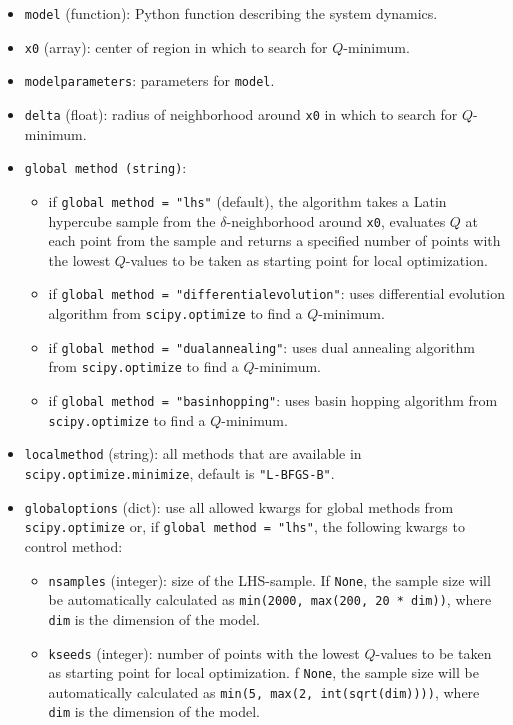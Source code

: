 \documentclass{article}
\theoremstyle{definition}
\begin{document}
\begin{refsection}
\begin{itemize}
    \item {\tt model} (function): Python function describing the system dynamics.
    \item {\tt x0} (array): center of region in which to search for $Q$-minimum.
    \item {\tt model\textunderscore parameters}: parameters for {\tt model}.
    \item {\tt delta} (float): radius of neighborhood around {\tt x0} in which to search for $Q$-minimum.
    \item {\tt global method (string)}: 
    \begin{itemize}
        \item if {\tt global method = "lhs"} (default), the algorithm takes a Latin hypercube sample from the $\delta$-neighborhood around {\tt x0}, evaluates $Q$ at each point from the sample and returns a specified number of points with the lowest $Q$-values to be taken as starting point for local optimization.
        \item if {\tt global method = "differential\textunderscore evolution"}: uses differential evolution algorithm from {\tt scipy.optimize} to find a $Q$-minimum.
        \item if {\tt global method = "dual\textunderscore annealing"}: uses dual annealing algorithm from {\tt scipy.optimize} to find a $Q$-minimum.
         \item if {\tt global method = "basin\textunderscore hopping"}: uses basin hopping algorithm from {\tt scipy.optimize} to find a $Q$-minimum.
    \end{itemize}
    \item {\tt local\textunderscore method} (string): all methods that are available in {\tt scipy.optimize.minimize}, default is {\tt "L-BFGS-B"}.
    \item {\tt global\textunderscore options} (dict): use all allowed kwargs for global methods from {\tt scipy.optimize} or, if {\tt global method = "lhs"}, the following kwargs to control method:
    \begin{itemize}
        \item {\tt n\textunderscore samples} (integer): size of the LHS-sample. If {\tt None}, the sample size will be automatically calculated as {\tt min(2000, max(200, 20 * dim))}, where {\tt dim} is the dimension of the model.
        \item {\tt k\textunderscore seeds} (integer): number of points with the lowest $Q$-values to be taken as starting point for local optimization. f {\tt None}, the sample size will be automatically calculated as {\tt min(5, max(2, int(sqrt(dim))))}, where {\tt dim} is the dimension of the model.

\end{itemize}
\end{itemize}
\end{refsection}
\end{document}
